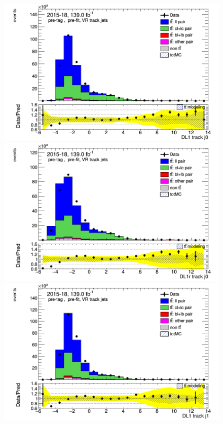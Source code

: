 \documentclass[letterpaper,12pt]{article}
\begin{document}
\newpage
\begin{figure}[h]
\begin{minipage}[b]{.45\textwidth}
\centering
\includegraphics[width=1\textwidth]{Oct_distributions/pretagNoRwDL1rwithhighpTVRJets_scaledall/DataMC__J0_DL1.png}
\end{minipage}\hfill
\begin{minipage}[b]{.45\textwidth}
\centering
\includegraphics[width=1\textwidth]{Oct_distributions/pretagNoRwDL1rwithhighpTVRJets_scaledall/DataMC__J0_DL1r.png}
\end{minipage}\hfill
\begin{minipage}[b]{.45\textwidth}
\centering
\includegraphics[width=1\textwidth]{Oct_distributions/pretagNoRwDL1rwithhighpTVRJets_scaledall/DataMC__J1_DL1.png}

\end{minipage}
\end{figure}
\end{document}
